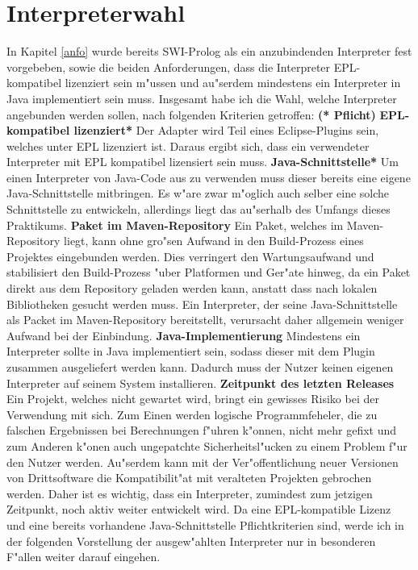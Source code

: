 \section{Interpreterwahl}
In Kapitel \ref{anfo} wurde bereits SWI-Prolog als ein anzubindenden Interpreter fest vorgebeben, sowie die beiden Anforderungen, dass die Interpreter EPL-kompatibel lizenziert sein m"ussen und au"serdem mindestens ein Interpreter in Java implementiert sein muss. \newline
Insgesamt habe ich die Wahl, welche Interpreter angebunden werden sollen, nach folgenden Kriterien getroffen: \textbf{(* Pflicht)}\newline
\newline
\textbf{EPL-kompatibel lizenziert*} Der Adapter wird Teil eines Eclipse-Plugins sein, welches unter EPL lizenziert ist. Daraus ergibt sich, dass ein verwendeter Interpreter mit EPL kompatibel lizensiert sein muss.\newline
\textbf{Java-Schnittstelle*} Um einen Interpreter von Java-Code aus zu verwenden muss dieser bereits eine eigene Java-Schnittstelle mitbringen. Es w"are zwar m"oglich auch selber eine solche Schnittstelle zu entwickeln, allerdings liegt das au"serhalb des Umfangs dieses Praktikums.\newline
\textbf{Paket im Maven-Repository} Ein Paket, welches im Maven-Repository liegt, kann ohne gro"sen Aufwand in den Build-Prozess eines Projektes eingebunden werden. Dies verringert den Wartungsaufwand und stabilisiert den Build-Prozess "uber Platformen und Ger"ate hinweg, da ein Paket direkt aus dem Repository geladen werden kann, anstatt dass nach lokalen Bibliotheken gesucht werden muss. Ein Interpreter, der seine Java-Schnittstelle als Packet im Maven-Repository bereitstellt, verursacht daher allgemein weniger Aufwand bei der Einbindung.\newline
\textbf{Java-Implementierung} Mindestens ein Interpreter sollte in Java implementiert sein, sodass dieser mit dem Plugin zusammen ausgeliefert werden kann. Dadurch muss der Nutzer keinen eigenen Interpreter auf seinem System installieren.\newline
\textbf{Zeitpunkt des letzten Releases} Ein Projekt, welches nicht gewartet wird, bringt ein gewisses Risiko bei der Verwendung mit sich. Zum Einen werden logische Programmfeheler, die zu falschen Ergebnissen bei Berechnungen f"uhren k"onnen, nicht mehr gefixt und zum Anderen k"onen auch ungepatchte Sicherheitsl"ucken zu einem Problem f"ur den Nutzer werden. Au"serdem kann mit der Ver"offentlichung neuer Versionen von Drittsoftware die Kompatibilit"at mit veralteten Projekten gebrochen werden. Daher ist es wichtig, dass ein Interpreter, zumindest zum jetzigen Zeitpunkt, noch aktiv weiter entwickelt wird.\newline
\newline
Da eine EPL-kompatible Lizenz und eine bereits vorhandene Java-Schnittstelle Pflichtkriterien sind, werde ich in der folgenden Vorstellung der ausgew"ahlten Interpreter nur in besonderen F"allen weiter darauf eingehen.
